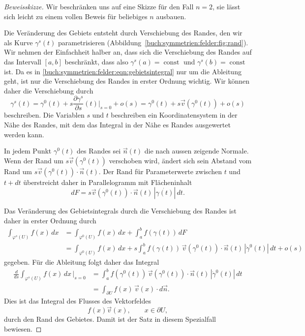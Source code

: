 \begin{proof}[Beweisskizze]
Wir beschränken uns auf eine Skizze für den Fall $n=2$, sie lässt
sich leicht zu einem vollen Beweis für beliebiges $n$ ausbauen.

Die Veränderung des Gebiets entsteht durch Verschiebung des Randes,
den wir als Kurve $\gamma^s(t)$ parametrisieren 
(Abbildung~\ref{buch:symmetrien:felder:fig:rand}).
Wir nehmen der Einfachheit halber an, dass sich die Verschiebung des
Randes auf das Intervall $[a,b]$ beschränkt, dass also
$\gamma^s(a)=\operatorname{const}$
und
$\gamma^s(b)=\operatorname{const}$
ist.
Da es in \eqref{buch:symmetrien:felder:eqn:gebietsintegral}
nur um die Ableitung geht, ist nur die Verschiebung des Randes 
in erster Ordnung wichtig.
Wir können daher die Verschiebung durch
\[
\gamma^s(t) 
=
\gamma^0(t)
+
s \frac{\partial \gamma^s}{\partial s}(t) \bigg|_{s=0}
+ o(s)
=
\gamma^0(t)
+
s\vec{v}(\gamma^0(t))
+
o(s)
\]
beschreiben.
Die Variablen $s$ und $t$ beschreiben ein Koordinatensystem in der
Nähe des Randes, mit dem das Integral in der Nähe es Randes ausgewertet
werden kann.

In jedem Punkt $\gamma^0(t)$ des Randes sei $\vec{n}(t)$ die nach
aussen zeigende Normale.
Wenn der Rand um $s\vec{v}(\gamma^0(t))$ verschoben wird,
ändert sich sein Abstand vom Rand um 
$s\vec{v}(\gamma^0(t))\cdot \vec{n}(t)$.
Der Rand für Parameterwerte zwischen $t$ und $t+dt$ überstreicht
daher in Parallelogramm mit Flächeninhalt
\[
dF
=
s\vec{v}(\gamma^0(t))\cdot \vec{n}(t)
\,
|\dot{\gamma(t)}|
\,dt.
\]

Das Veränderung des Gebietsintegrals durch die Verschiebung des
Randes ist daher in erster Ordnung durch
\begin{align*}
\int_{\varphi^s(U)} f(x)\,dx
&=
\int_{\varphi^0(U)} f(x)\,dx
+
\int_a^b
f(\gamma(t))
\,dF
\\
&=
\int_{\varphi^0(U)} f(x)\,dx
+
s
\int_a^b
f(\gamma(t))
\,
\vec{v}(\gamma^0(t))
\cdot \vec{n}(t)
\,
|\dot{\gamma}^0(t)|
\,dt
+
o(s)
\end{align*}
gegeben.
Für die Ableitung folgt daher das Integral
\begin{align*}
\frac{d}{ds}
\int_{\varphi^s(U)} f(x)\,dx\,\bigg|_{s=0}
&=
\int_a^b
f(\gamma^0(t))
\,
\vec{v}(\gamma^0(t)) \cdot \vec{n}(t)
\,
|\dot{\gamma}^0(t)|\,dt
\\
&=
\int_{\partial U}
f(x)
\,
\vec{v}(x) \cdot
d\vec{n}.
\end{align*}
Dies ist das Integral des Flusses des Vektorfeldes 
\[
f(x)  \vec{v}(x),\qquad x\in\partial U,
\]
durch den Rand des Gebietes.
Damit ist der Satz in diesem Spezialfall bewiesen.
\end{proof}

